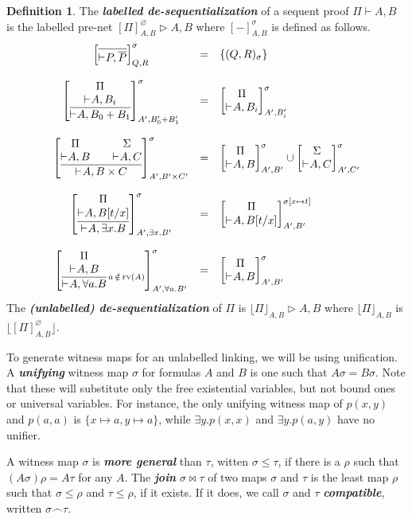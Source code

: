 \documentclass{article}
\theoremstyle{definition}
\newtheorem{definition}{Definition}
\theoremstyle{plain}
\newcommand\defn[1]{\textit{\textbf{#1}}}
\newcommand\floor[1]{\lfloor#1\rfloor}
\newcommand\+{+}
\renewcommand\*{\times}
\newcommand\dual[1]{\overline{#1}}
\newcommand\seq[3][]{{\vdash_{#1}}#2,#3}
\newcommand\prf[3]{#1\vdash\!#2,#3}
\newcommand\net[3]{#1\triangleright #2,#3}
\newcommand\deseq[4][\sigma]{[#2]^{#1}_{#3,#4}}
\newcommand\Deseq[4][\sigma]{\left[\vcenter{#2}\right]^{#1}_{#3,#4}}
\newcommand\join\bowtie
\newcommand\comp\frown
\newcommand\clink[3][\sigma]{(#2,#3)_{#1}}
\begin{document}
\begin{definition}
The \defn{labelled de-sequentialization} of a sequent proof $\prf\Pi AB$ is the labelled pre-net $\net{\deseq[\varnothing]\Pi AB} AB$ where $\deseq-AB$ is defined as follows.
%
\[
\begin{array}{ccl}
	\Deseq{\infer{\seq P{\dual P}}{}}QR &=& \{\clink QR\}
\\ \\
	\Deseq{\infer {\seq A {B_0\+B_1}} {\deduce [\rule{0pt}{1pt}] {\seq A{B_i}} \Pi }}
	  {A'}{B_0'\+B'_1} 
	&=& \Deseq{\deduce[\rule{0pt}{1pt}]{\seq A{B_i}}\Pi}{A'}{B_i'}
\\ \\
	\Deseq{\infer{\seq A{B\*C}}{
	  \deduce[\rule{0pt}{1pt}]{\seq AB}\Pi 
	  && 
	  \deduce[\rule{0pt}{1pt}]{\seq AC}\Sigma}}{A'}{B'\*C'}
	&=& \Deseq{\deduce[\rule{0pt}{1pt}]{\seq AB}\Pi}{A'}{B'}
	  \cup
	  \Deseq{\deduce[\rule{0pt}{1pt}]{\seq AC}\Sigma}{A'}{C'}
\\ \\
	\Deseq{\infer{\seq A{\exists x.B}}{\deduce[\rule{0pt}{1pt}]{\seq A{B[t/x]}}\Pi}}
	  {A'}{\exists x.B'}
	&=&
	 \Deseq[{\sigma[x\mapsto t]}]{\deduce[\rule{0pt}{1pt}]{\seq A{B[t/x]}}\Pi}
	  {A'}{B'}
\\ \\
	\Deseq{\infer[\!\!\scriptstyle{a\,\notin\,\textsc{fv}(A)}]
	  {\seq A{\forall a.B}}{\deduce[\rule{0pt}{1pt}]{\seq AB}\Pi}}{A'}{\forall a.B'}
	&=&
	  \Deseq{\deduce[\rule{0pt}{1pt}]{\seq AB}\Pi}{A'}{B'}
\end{array}
\]
The \defn{(unlabelled) de-sequentialization} of $\Pi$ is $\net{\floor\Pi_{A,B}}AB$ where $\floor\Pi_{A,B}$ is $\floor{\deseq[\varnothing]\Pi AB}$.
\end{definition}


To generate witness maps for an unlabelled linking, we will be using unification. A \defn{unifying} witness map $\sigma$ for formulas $A$ and $B$ is one such that $A\sigma=B\sigma$. Note that these will substitute only the free existential variables, but not bound ones or universal variables. For instance, the only unifying witness map of $p(x,y)$ and $p(a,a)$ is $\{x\mapsto a,y\mapsto a\}$, while $\exists y.p(x,x)$ and $\exists y.p(a,y)$ have no unifier.

A witness map $\sigma$ is \defn{more general} than $\tau$, witten $\sigma\leq\tau$, if there is a $\rho$ such that $(A\sigma)\rho = A\tau$ for any $A$. The \defn{join} $\sigma\join\tau$ of two maps $\sigma$ and $\tau$ is the least map $\rho$ such that $\sigma\leq\rho$ and $\tau\leq\rho$, if it exists. If it does, we call $\sigma$ and $\tau$ \defn{compatible}, written $\sigma\comp\tau$. 
\end{document}
